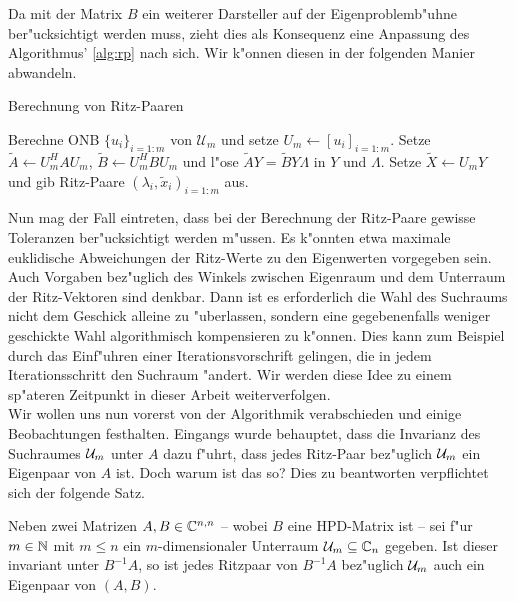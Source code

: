 Da mit der Matrix $B$ ein weiterer Darsteller auf der Eigenproblemb"uhne ber"ucksichtigt werden muss, zieht dies als Konsequenz eine Anpassung des Algorithmus' \ref{alg:rp} nach sich. Wir k"onnen diesen in der folgenden Manier abwandeln.

\begin{algorithm}\label{alg:grp}
\caption{Berechnung von Ritz-Paaren}
\begin{algorithmic}[1]
\State Berechne ONB $\{u_i\}_{i=1:m}$ von $\mathcal{U}_m$ und setze $U_m\gets[u_i]_{i=1:m}$.
\State Setze $\widetilde{A}\gets U_m^H A U_m$,
$\widetilde{B} \gets U_m^H BU_m$ und
l"ose $\widetilde{A}Y = \widetilde{B}Y \Lambda$ in $Y$ und $\Lambda$.
\State Setze $\widetilde{X} \gets U_m Y$ und gib Ritz-Paare $(\lambda_i, \widetilde{x}_i)_{i=1:m}$ aus.
\end{algorithmic}
\end{algorithm}

Nun mag der Fall eintreten, dass bei der Berechnung der Ritz-Paare gewisse Toleranzen ber"ucksichtigt werden m"ussen.
Es k"onnten etwa maximale euklidische Abweichungen der Ritz-Werte zu den Eigenwerten vorgegeben sein.
Auch Vorgaben bez"uglich des Winkels zwischen Eigenraum und dem Unterraum der Ritz-Vektoren sind denkbar. Dann ist es erforderlich die Wahl des Suchraums nicht dem Geschick alleine zu "uberlassen, sondern eine gegebenenfalls weniger geschickte Wahl algorithmisch kompensieren zu k"onnen.
Dies kann zum Beispiel durch das Einf"uhren einer Iterationsvorschrift gelingen, die in jedem Iterationsschritt den Suchraum "andert.
Wir werden diese Idee zu einem sp"ateren Zeitpunkt in dieser Arbeit weiterverfolgen.\\

Wir wollen uns nun vorerst von der Algorithmik verabschieden und einige Beobachtungen
festhalten. Eingangs wurde behauptet, dass die Invarianz des Suchraumes $\mathcal{U}_m$ unter
$A$ dazu f"uhrt, dass jedes Ritz-Paar bez"uglich $\mathcal{U}_m$ ein Eigenpaar von $A$ ist.
Doch warum ist das so? Dies zu beantworten verpflichtet sich der folgende Satz.

\begin{thm}\label{thm:invariant}
Neben zwei Matrizen $A,B\in\mathbb{C}^{n,n}$ -- wobei $B$ eine HPD-Matrix ist -- sei f"ur
$m\in\mathbb{N}$ mit $m\le n$ ein $m$-dimensionaler Unterraum $\mathcal{U}_m \subseteq \mathbb{C}_n$ gegeben.
Ist dieser invariant unter $B^{-1}A$, so ist jedes Ritzpaar von $B^{-1}A$
bez"uglich $\mathcal{U}_m$ auch ein Eigenpaar von $(A,B)$.
\end{thm}

